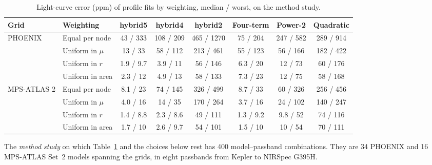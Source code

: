 \documentclass{aa}
\begin{document}
\begin{table}
\caption{Light-curve error (ppm) of profile fits by weighting, median / worst,
on the method study.}
\label{tab:weighting}
\centering
\begin{tabular}{llcccccc}
\hline\hline
Grid & Weighting & hybrid5 & hybrid4 & hybrid2 & Four-term & Power-2 & Quadratic\\
\hline
PHOENIX & Equal per node & 43 / 333 & 108 / 209 & 465 / 1270 & 75 / 204 & 247 / 582 & 289 / 914\\
 & Uniform in $\mu$ & 13 / 33 & 58 / 112 & 213 / 461 & 55 / 123 & 56 / 166 & 182 / 422\\
 & Uniform in $r$ & 1.9 / 9.7 & 3.9 / 11 & 56 / 146 & 6.3 / 20 & 12 / 73 & 60 / 176\\
 & Uniform in area & 2.3 / 12 & 4.9 / 13 & 58 / 133 & 7.3 / 23 & 12 / 75 & 58 / 168\\
MPS-ATLAS 2 & Equal per node & 8.1 / 23 & 74 / 145 & 326 / 499 & 8.7 / 33 & 60 / 326 & 256 / 456\\
 & Uniform in $\mu$ & 4.0 / 16 & 14 / 35 & 170 / 264 & 3.7 / 16 & 24 / 102 & 140 / 247\\
 & Uniform in $r$ & 1.4 / 8.8 & 2.3 / 8.6 & 49 / 111 & 1.3 / 9.2 & 9.8 / 52 & 74 / 116\\
 & Uniform in area & 1.7 / 10 & 2.6 / 9.7 & 54 / 101 & 1.5 / 10 & 10 / 54 & 70 / 111\\
\hline
\end{tabular}
\end{table}

The \emph{method study} on which Table~\ref{tab:weighting} and the choices
below rest has 400 model--passband combinations. They are 34 PHOENIX and 16
MPS-ATLAS Set~2 models spanning the grids, in eight passbands from Kepler to
NIRSpec G395H.
\end{document}
